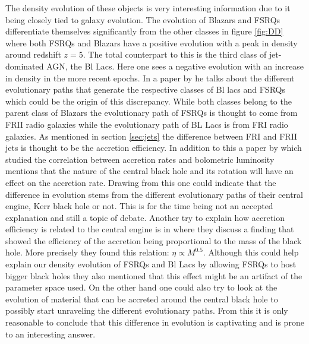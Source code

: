 

The density evolution of these objects is very interesting information due to it being closely tied to galaxy evolution. The evolution of Blazars and FSRQs differentiate themselves significantly from the other classes in figure \ref*{fig:DD}
where both FSRQs and Blazars have a positive evolution with a peak in density around redshift $z=5$. The total counterpart to this is the third class of jet-dominated AGN, the Bl Lacs. Here one sees a negative evolution with 
an increase in density in the more recent epochs. In a paper by \cite{Garofalo_2019} he talks about the different evolutionary paths that generate the respective classes of Bl lacs and FSRQs which could be the origin of this discrepancy. 
While both classes belong to the parent class of Blazars the evolutionary path of FSRQs is thought to come from FRII radio galaxies while the evolutionary path of BL Lacs is from FRI radio galaxies. As mentioned in section \ref*{sec:jets} the difference between FRI and FRII jets is thought to be the accretion efficiency. 
In addition to this a paper by \cite{Wei-Hao_2003} which studied the correlation between accretion rates and bolometric luminosity mentions that the nature of the central black hole and its rotation will have an effect on the accretion rate. Drawing from this one could indicate that the difference in evolution stems from the different evolutionary paths of their central engine, Kerr black hole or not.  
This is for the time being not an accepted explanation and still a topic of debate. 
Another try to explain how accretion efficiency is related to the central engine is in \cite{Raimundo_2012} where they discuss a finding that showed the efficiency of the accretion being proportional to the mass of the black hole.  
More precisely they found this relation: $\eta \propto M^{0.5}$. Although this could help explain our density evolution of FSRQs and Bl Lacs by allowing FSRQs to host bigger black holes they also mentioned that this effect might be an artifact of the parameter space used. 
On the other hand one could also try to look at the evolution of material that can be accreted around the central black hole to possibly start unraveling the different evolutionary paths.
From this it is only reasonable to conclude that this difference in evolution is captivating and is prone to an interesting answer. 


